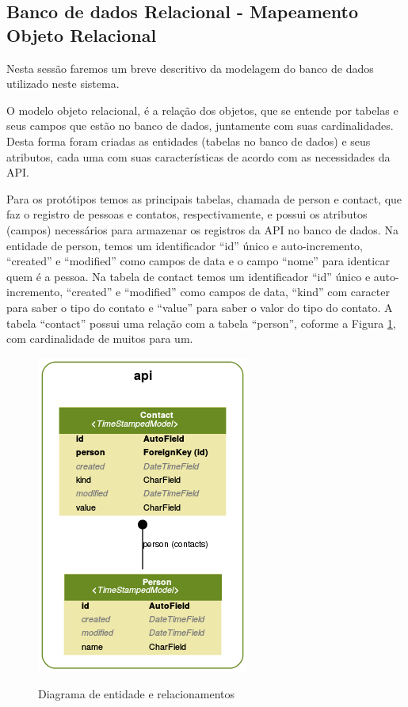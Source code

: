   
\subsection{Banco de dados Relacional - Mapeamento Objeto Relacional}
\label{banco-de-dados}

  Nesta sessão faremos um breve descritivo da modelagem do banco de
  dados utilizado neste sistema.
  
  O modelo objeto relacional, é a relação dos objetos, que se entende por tabelas e seus campos que estão 
  no banco de dados, juntamente com suas cardinalidades. Desta forma foram criadas as entidades
  (tabelas no banco de dados) e seus atributos, cada uma com suas características de
  acordo com as necessidades da \ac{API}.
  
  Para os protótipos temos as principais tabelas, chamada de person e contact,
  que faz o registro de pessoas e contatos, respectivamente, e possui os atributos (campos) necessários
  para armazenar os registros da \ac{API} no banco de dados. Na entidade de person, temos um identificador
  ``id'' único e auto-incremento, ``created'' e ``modified'' como campos de data e o campo
  ``nome'' para identicar quem é a pessoa. Na tabela de contact temos um identificador ``id'' único e auto-incremento,
  ``created'' e ``modified'' como campos de data, ``kind'' com caracter para saber o tipo do contato e ``value'' para 
  saber o valor do tipo do contato. A tabela ``contact'' possui uma relação com a tabela ``person'', coforme a Figura 
  \ref{fig:der}, com cardinalidade de muitos para um.

  \begin{figure}[H]
  \setlength{\abovecaptionskip}{0pt}
  \setlength{\belowcaptionskip}{0pt}
  \caption[Diagrama de entidade e relacionamentos]{Diagrama de entidade e relacionamentos}
  \centering
  \includegraphics[width=.55\textwidth]{imagem/der.png}
  \captionsetup{justification=centering}
  \label{fig:der}
  \end{figure}
  
